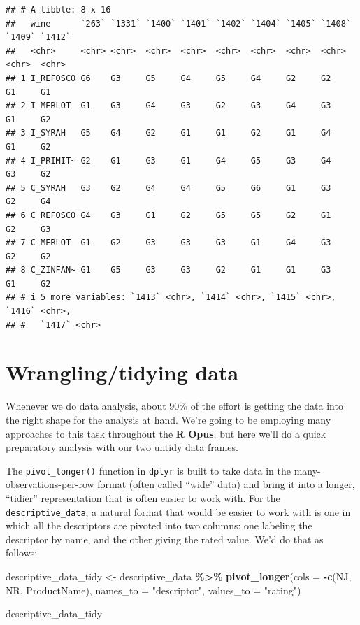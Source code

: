 \documentclass[
]{book}
\newenvironment{Shaded}{\begin{snugshade}}{\end{snugshade}}
\newcommand{\AttributeTok}[1]{\textcolor[rgb]{0.13,0.29,0.53}{#1}}
\newcommand{\FunctionTok}[1]{\textcolor[rgb]{0.13,0.29,0.53}{\textbf{#1}}}
\newcommand{\NormalTok}[1]{#1}
\newcommand{\OtherTok}[1]{\textcolor[rgb]{0.56,0.35,0.01}{#1}}
\newcommand{\SpecialCharTok}[1]{\textcolor[rgb]{0.81,0.36,0.00}{\textbf{#1}}}
\newcommand{\StringTok}[1]{\textcolor[rgb]{0.31,0.60,0.02}{#1}}
\begin{document}
\begin{verbatim}
## # A tibble: 8 x 16
##   wine      `263` `1331` `1400` `1401` `1402` `1404` `1405` `1408` `1409` `1412`
##   <chr>     <chr> <chr>  <chr>  <chr>  <chr>  <chr>  <chr>  <chr>  <chr>  <chr> 
## 1 I_REFOSCO G6    G3     G5     G4     G5     G4     G2     G2     G1     G1    
## 2 I_MERLOT  G1    G3     G4     G3     G2     G3     G4     G3     G1     G2    
## 3 I_SYRAH   G5    G4     G2     G1     G1     G2     G1     G4     G1     G2    
## 4 I_PRIMIT~ G2    G1     G3     G1     G4     G5     G3     G4     G3     G2    
## 5 C_SYRAH   G3    G2     G4     G4     G5     G6     G1     G3     G2     G4    
## 6 C_REFOSCO G4    G3     G1     G2     G5     G5     G2     G1     G2     G3    
## 7 C_MERLOT  G1    G2     G3     G3     G3     G1     G4     G3     G2     G2    
## 8 C_ZINFAN~ G1    G5     G3     G3     G2     G1     G1     G3     G1     G2    
## # i 5 more variables: `1413` <chr>, `1414` <chr>, `1415` <chr>, `1416` <chr>,
## #   `1417` <chr>
\end{verbatim}

\section{Wrangling/tidying data}\label{wranglingtidying-data}

Whenever we do data analysis, about 90\% of the effort is getting the data into the right shape for the analysis at hand. We're going to be employing many approaches to this task throughout the \textbf{R Opus}, but here we'll do a quick preparatory analysis with our two untidy data frames.

The \texttt{pivot\_longer()} function in \texttt{dplyr} is built to take data in the many-observations-per-row format (often called ``wide'' data) and bring it into a longer, ``tidier'' representation that is often easier to work with. For the \texttt{descriptive\_data}, a natural format that would be easier to work with is one in which all the descriptors are pivoted into two columns: one labeling the descriptor by name, and the other giving the rated value. We'd do that as follows:

\begin{Shaded}
\begin{Highlighting}[]
\NormalTok{descriptive\_data\_tidy }\OtherTok{\textless{}{-}} 
\NormalTok{  descriptive\_data }\SpecialCharTok{\%\textgreater{}\%}
  \FunctionTok{pivot\_longer}\NormalTok{(}\AttributeTok{cols =} \SpecialCharTok{{-}}\FunctionTok{c}\NormalTok{(NJ, NR, ProductName),}
               \AttributeTok{names\_to =} \StringTok{"descriptor"}\NormalTok{,}
               \AttributeTok{values\_to =} \StringTok{"rating"}\NormalTok{)}

\NormalTok{descriptive\_data\_tidy}
\end{Highlighting}
\end{Shaded}
\end{document}
